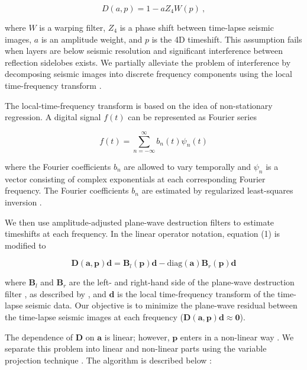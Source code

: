 \begin{equation}
D(a,p)=1-aZ_4W(p) \ ,
\end{equation}

where $W$ is a warping filter, $Z_4$ is a phase shift between time-lapse seismic images, $a$ is an amplitude weight, and $p$ is the 4D timeshift. 
This assumption fails when layers are below seismic resolution and significant interference between reflection sidelobes exists.
We partially alleviate the problem of interference by decomposing seismic images into discrete frequency components using the local time-frequency transform \cite[]{liu}.

The local-time-frequency transform is based on the idea of non-stationary regression.
A digital signal $f(t)$ can be represented as Fourier series

\begin{equation}
f(t)=\sum_{n=-\infty}^{\infty}b_n(t)\psi_n(t)
\end{equation}

where the Fourier coefficients ${b}_n$ are allowed to vary temporally and $\psi_n$ is a vector consisting of complex exponentials at each corresponding Fourier frequency.
The Fourier coefficients $b_n$ are estimated by regularized least-squares inversion \cite[]{fomel08}.

We then use amplitude-adjusted plane-wave destruction filters \cite[]{phillips} to estimate timeshifts at each frequency.
In the linear operator notation, equation (1) is modified to

\begin{equation}
\mathbf{D}(\mathbf{a},\mathbf{p})\mathbf{d}=\mathbf{B}_l(\mathbf{p})\mathbf{d}-\mbox{diag}(\mathbf{a})\mathbf{B}_r(\mathbf{p})\mathbf{d}
\end{equation}

where $\mathbf{B}_l$ and $\mathbf{B}_r$ are the left- and right-hand side of the plane-wave destruction filter \cite[]{fomel02}, as described by \cite{phillips}, and $\mathbf{d}$ is the local time-frequency transform of the time-lapse seismic data.
Our objective is to minimize the plane-wave residual between the time-lapse seismic images at each frequency ($\mathbf{D}(\mathbf{a},\mathbf{p})\mathbf{d}\approx\mathbf{0}$).

The dependence of $\mathbf{D}$ on $\mathbf{a}$ is linear; however, $\mathbf{p}$ enters in a non-linear way \cite[]{fomel02}.
We separate this problem into linear and non-linear parts using the variable projection technique \cite[]{golub,kaufman}.
The algorithm is described below \cite[]{phillips}:

